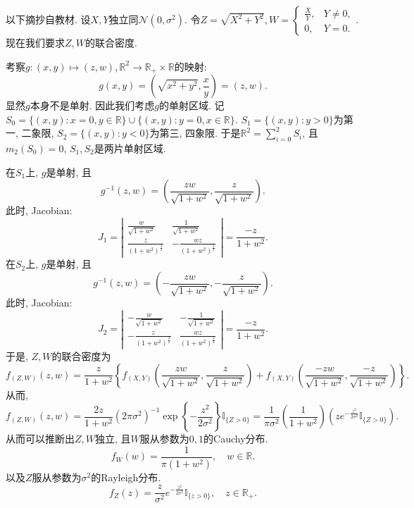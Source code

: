 \documentclass[UTF8, a4paper]{article}
\begin{document}
\begin{framed}
以下摘抄自教材.
设\(X, Y\)独立同\(\mathcal{N}(0, \sigma^2)\). 令\(Z = \sqrt{X^2+ Y^2}, W = \begin{cases}
    \frac{X}{Y}, & Y \neq 0, \\
    0, & Y = 0.
\end{cases}\). 现在我们要求\(Z, W\)的联合密度.

考察\(g:(x,y) \mapsto (z,w), \mathbb{R}^2 \to \mathbb{R}_+ \times \mathbb{R}\)的映射:
$$
g(x,y) = \left(\sqrt{x^2 + y^2}, \frac{x}{y}\right) = (z, w).
$$
显然\(g\)本身不是单射. 因此我们考虑\(g\)的单射区域.  
记\(S_0 = \{(x,y): x = 0, y\in \mathbb{R}\} \cup \{(x,y): y = 0, x\in \mathbb{R}\}\).
\(S_1 = \{(x, y): y > 0\}\)为第一, 二象限, \(S_2 = \{(x, y): y < 0\}\)为第三, 四象限.
于是\(\mathbb{R}^2 = \sum_{i=0}^{2}S_i\), 且\(m_2(S_0) = 0\), \(S_1, S_2\)是两片单射区域.

在\(S_1\)上, \(g\)是单射, 且$$
g^{-1}(z,w) = \left(\frac{zw}{\sqrt{1+w^2}}, \frac{z}{\sqrt{1+w^2}}\right).
$$
此时, Jacobian:
$$
J_1 = \left|\begin{matrix}
    \frac{w}{\sqrt{1+w^2}} & \frac{1}{\sqrt{1+w^2}} \\
    \frac{z}{{(1+w^2)^{\frac{3}{2}}}} & -\frac{wz}{(1+w^2)^{\frac{3}{2}}}
\end{matrix}\right| = \frac{-z}{1+w^2}.
$$
在\(S_2\)上, \(g\)是单射, 且$$
g^{-1}(z,w) = \left(-\frac{zw}{\sqrt{1+w^2}}, -\frac{z}{\sqrt{1+w^2}}\right).
$$
此时, Jacobian:
$$
J_2 = \left|\begin{matrix}
    -\frac{w}{\sqrt{1+w^2}} & -\frac{1}{\sqrt{1+w^2}} \\
    -\frac{z}{{(1+w^2)^{\frac{3}{2}}}} & \frac{wz}{(1+w^2)^{\frac{3}{2}}}
\end{matrix}\right| = \frac{-z}{1+w^2}.
$$
于是, \(Z, W\)的联合密度为
$$
f_{(Z,W)}(z,w) = \frac{z}{1+w^2}\left\{f_{(X,Y)}\left(\frac{zw}{\sqrt{1+w^2}}, \frac{z}{\sqrt{1+w^2}}\right) + f_{(X,Y)}\left(\frac{-zw}{\sqrt{1+w^2}}, \frac{-z}{\sqrt{1+w^2}}\right)\right\}.
$$
从而, 
$$
f_{(Z,W)}(z,w) = \frac{2z}{1+w^2} (2\pi\sigma^2)^{-1} \exp\left\{-\frac{z^2}{2\sigma^2}\right\} \mathbb{I}_{\{Z >0\}} = \frac{1}{\pi \sigma^2}\left(\frac{1}{1+w^2}\right)\left(z e^{-\frac{z^2}{2\sigma^2}} \mathbb{I}_{\{Z > 0\}}\right).
$$
从而可以推断出\(Z,W\)独立, 且\(W\)服从参数为\(0, 1\)的Cauchy分布.
$$
f_W(w) = \frac{1}{\pi(1+w^2)}, \quad w \in \mathbb{R}.
$$
以及\(Z\)服从参数为\(\sigma^2\)的Rayleigh分布. 
$$
f_Z(z) = \frac{z}{\sigma^2} e^{-\frac{z^2}{2\sigma^2}} \mathbb{I}_{\{z > 0\}}, \quad z \in \mathbb{R}_+.
$$
\end{framed}
\end{document}
